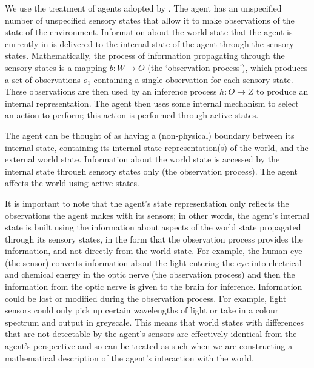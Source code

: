 We use the treatment of agents adopted by \cite{Higgins2018}.
The agent has an unspecified number of unspecified sensory states that allow it to make observations of the state of the environment.
Information about the world state that the agent is currently in is delivered to the internal state
 of the agent through the sensory states.
Mathematically, the process of information propagating through the sensory states is a mapping $b : W \to O$ (the `observation process'), which produces a set of observations $o_1$ containing a single observation for each sensory state.
These observations are then used by an inference process $h : O \to Z$ to produce an internal representation.
The agent then uses some internal mechanism to select an action to perform; this action is performed through active states.

The agent can be thought of as having a (non-physical) boundary between its internal state, containing its internal state representation(s) of the world, and the external world state.
Information about the world state is accessed by the internal state through sensory states only (the observation process).
The agent affects the world using active states.

It is important to note that the agent's state representation only reflects the observations the agent makes with its sensors; in other words, the agent's internal state is built using the information about aspects of the world state propagated through its sensory states, in the form that the observation process provides the information, and not directly from the world state.
For example, the human eye (the sensor) converts information about the light entering the eye into electrical and chemical energy in the optic nerve (the observation process) and then the information from the optic nerve is given to the brain for inference.
Information could be lost or modified during the observation process.
For example, light sensors could only pick up certain wavelengths of light or take in a colour spectrum and output in greyscale.
This means that world states with differences that are not detectable by the agent's sensors are effectively identical from the agent's perspective and so can be treated as such when we are constructing a mathematical description of the agent's interaction with the world.

